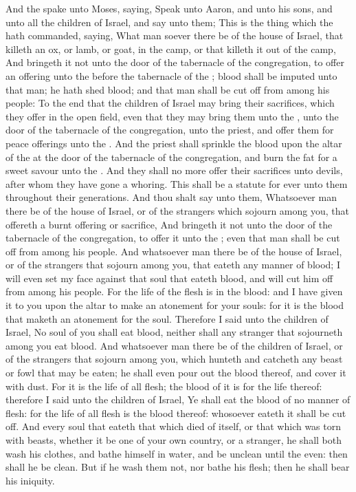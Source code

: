 \begin{biblechapter} %
 And the \LORD spake unto Moses, saying,
\verse Speak unto Aaron, and unto his sons, and unto all the children of Israel, and say unto them; This is the thing which the \LORD hath commanded, saying,
\verse What man soever there be of the house of Israel, that killeth an ox, or lamb, or goat, in the camp, or that killeth it out of the camp,
\verse And bringeth it not unto the door of the tabernacle of the congregation, to offer an offering unto the \LORD before the tabernacle of the \LORD; blood shall be imputed unto that man; he hath shed blood; and that man shall be cut off from among his people:
\verse To the end that the children of Israel may bring their sacrifices, which they offer in the open field, even that they may bring them unto the \LORD, unto the door of the tabernacle of the congregation, unto the priest, and offer them for peace offerings unto the \LORD.
\verse And the priest shall sprinkle the blood upon the altar of the \LORD at the door of the tabernacle of the congregation, and burn the fat for a sweet savour unto the \LORD.
\verse And they shall no more offer their sacrifices unto devils, after whom they have gone a whoring. This shall be a statute for ever unto them throughout their generations.
\verse And thou shalt say unto them, Whatsoever man there be of the house of Israel, or of the strangers which sojourn among you, that offereth a burnt offering or sacrifice,
\verse And bringeth it not unto the door of the tabernacle of the congregation, to offer it unto the \LORD; even that man shall be cut off from among his people.
\verse And whatsoever man there be of the house of Israel, or of the strangers that sojourn among you, that eateth any manner of blood; I will even set my face against that soul that eateth blood, and will cut him off from among his people.
\verse For the life of the flesh is in the blood: and I have given it to you upon the altar to make an atonement for your souls: for it is the blood that maketh an atonement for the soul.
\verse Therefore I said unto the children of Israel, No soul of you shall eat blood, neither shall any stranger that sojourneth among you eat blood.
\verse And whatsoever man there be of the children of Israel, or of the strangers that sojourn among you, which hunteth and catcheth any beast or fowl that may be eaten; he shall even pour out the blood thereof, and cover it with dust.
\verse For it is the life of all flesh; the blood of it is for the life thereof: therefore I said unto the children of Israel, Ye shall eat the blood of no manner of flesh: for the life of all flesh is the blood thereof: whosoever eateth it shall be cut off.
\verse And every soul that eateth that which died of itself, or that which was torn with beasts, whether it be one of your own country, or a stranger, he shall both wash his clothes, and bathe himself in water, and be unclean until the even: then shall he be clean.
\verse But if he wash them not, nor bathe his flesh; then he shall bear his iniquity.
\end{biblechapter}

